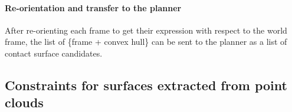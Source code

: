 \paragraph{Re-orientation and transfer to the planner}
After re-orienting each frame to get their expression with respect to the world frame, the list of \{frame + convex hull\} can be sent to the planner as a list of contact surface candidates.



\subsection{Constraints for surfaces extracted from point clouds}



